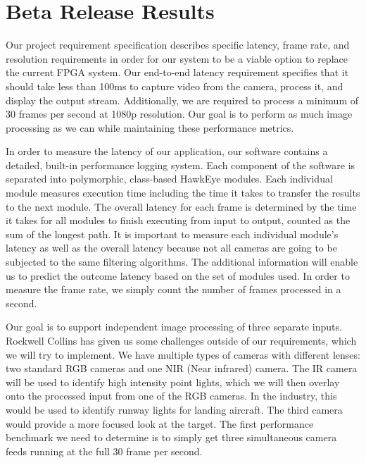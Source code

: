 \documentclass[letterpaper,10pt,titlepage]{IEEEtran}
\begin{document}
    
\section{Beta Release Results}
   Our project requirement specification describes specific latency, frame rate, and resolution requirements in order for our system to be a viable option to replace the current FPGA system. Our end-to-end latency requirement specifies that it should take less than 100ms to capture video from the camera, process it, and display the output stream. Additionally, we are required to process a minimum of 30 frames per second at 1080p resolution. Our goal is to perform as much image processing as we can while maintaining these performance metrics.\\
\par
In order to measure the latency of our application, our software contains a detailed, built-in performance logging system. Each component of the software is separated into polymorphic, class-based HawkEye modules. Each individual module measures execution time including the time it takes to transfer the results to the next module. The overall latency for each frame is determined by the time it takes for all modules to finish executing from input to output, counted as the sum of the longest path. It is important to measure each individual module's latency as well as the overall latency because not all cameras are going to be subjected to the same filtering algorithms. The additional information will enable us to predict the outcome latency based on the set of modules used. In order to measure the frame rate, we simply count the number of frames processed in a second.\\
\par
Our goal is to support independent image processing of three separate inputs. Rockwell Collins has given us some challenges outside of our requirements, which we will try to implement. We have multiple types of cameras with different lenses: two standard RGB cameras and one NIR (Near infrared) camera. The IR camera will be used to identify high intensity point lights, which we will then overlay onto the processed input from one of the RGB cameras. In the industry, this would be used to identify runway lights for landing aircraft. The third camera would provide a more focused look at the target. The first performance benchmark we need to determine is to simply get three simultaneous camera feeds running at the full 30 frame per second.\\
\end{document}

